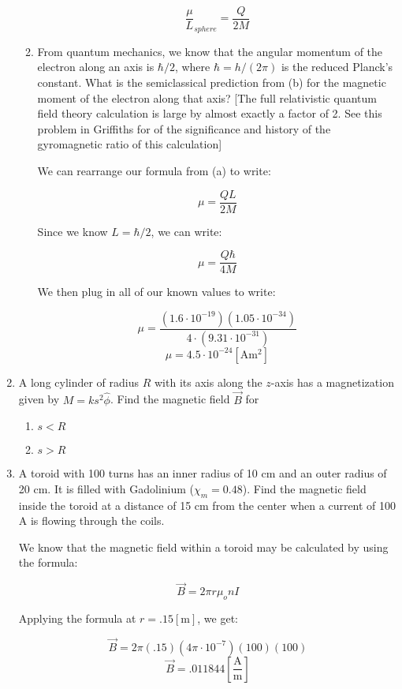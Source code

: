 \begin{enumerate}
\begin{enumerate}
        $$\boxed{\frac{\mu}{L}_{sphere}=\frac{Q}{2M}}$$

      \item From quantum mechanics, we know that the angular momentum of the electron along an axis is $\hbar/2$, where $\hbar=h/(2\pi)$ is the reduced Planck’s constant. What is the semiclassical prediction from (b) for the magnetic moment of the electron along that axis? [The full relativistic quantum field theory calculation is large by almost exactly a factor of 2.  See this problem in Griffiths for of the significance and history of the gyromagnetic ratio of this calculation]

        We can rearrange our formula from (a) to write:

        $$\mu=\frac{QL}{2M}$$

        Since we know $L=\hbar/2$, we can write:

        $$\mu=\frac{Q\hbar}{4M}$$

        We then plug in all of our known values to write:

        $$\mu=\frac{(1.6\cdot10^{-19})(1.05\cdot10^{-34})}{4\cdot(9.31\cdot10^{-31})}$$
        $$\boxed{\mu=4.5\cdot10^{-24}[\si{\ampere\meter\squared}]}$$

    \end{enumerate}

  \item A long cylinder of radius $R$ with its axis along the $z$-axis has a magnetization given by $M=ks^2\hat{\phi}$. Find the magnetic field $\vec{B}$ for 

    \begin{enumerate}

      \item $s<R$

      \item $s>R$

    \end{enumerate}

  \item A toroid with 100 turns has an inner radius of 10 cm and an outer radius of 20 cm. It is filled with Gadolinium ($\chi_m=0.48$). Find the magnetic field inside the toroid at a distance of 15 cm from the center when a current of 100 A is flowing through the coils.

    We know that the magnetic field within a toroid may be calculated by using the formula:

    $$\vec{B}=2\pi r\mu_onI$$

    Applying the formula at $r=.15[\si{\meter}]$, we get:

    $$\vec{B}=2\pi(.15)\left( 4\pi\cdot10^{-7} \right)(100)(100)$$
    $$\boxed{\vec{B}=.011844\left[ \frac{\si{\ampere}}{\si{\meter}} \right]}$$

\end{enumerate}



